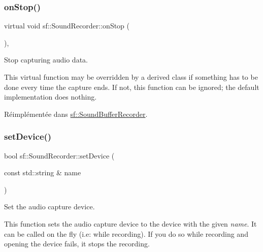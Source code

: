 \mbox{\label{classsf_1_1SoundRecorder_aefc36138ca1e96c658301280e4a31b64}} 
\subsubsection{\texorpdfstring{on\+Stop()}{onStop()}}
{\footnotesize\ttfamily virtual void sf\+::\+Sound\+Recorder\+::on\+Stop (\begin{DoxyParamCaption}{ }\end{DoxyParamCaption})\hspace{0.3cm}{\ttfamily [protected]}, {\ttfamily [virtual]}}



Stop capturing audio data. 

This virtual function may be overridden by a derived class if something has to be done every time the capture ends. If not, this function can be ignored; the default implementation does nothing. 

Réimplémentée dans \hyperlink{classsf_1_1SoundBufferRecorder_ab8e53849312413431873a5869d509f1e}{sf\+::\+Sound\+Buffer\+Recorder}.

\mbox{\label{classsf_1_1SoundRecorder_a8eb3e473292c16e874322815836d3cd3}} 
\subsubsection{\texorpdfstring{set\+Device()}{setDevice()}}
{\footnotesize\ttfamily bool sf\+::\+Sound\+Recorder\+::set\+Device (\begin{DoxyParamCaption}\item[{const std\+::string \&}]{name }\end{DoxyParamCaption})}



Set the audio capture device. 

This function sets the audio capture device to the device with the given {\itshape name}. It can be called on the fly (i.\+e\+: while recording). If you do so while recording and opening the device fails, it stops the recording.


